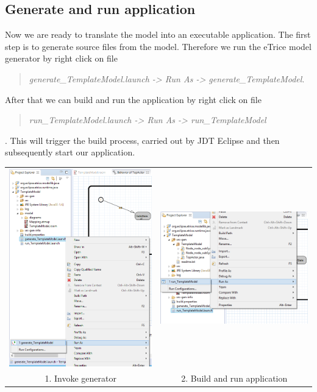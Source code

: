 \subsection{Generate and run application}

Now we are ready to translate the model into an executable application. The first step is to generate source files from the model. Therefore we run the eTrice model generator by right click on file \begin{quote}
	\emph{generate\_TemplateModel.launch -> Run As -> generate\_TemplateModel}.
\end{quote}
After that we can build and run the application by right click on file
\begin{quote}
	\emph{run\_TemplateModel.launch -> Run As -> run\_TemplateModel}
\end{quote}.
This will trigger the build process, carried out by JDT Eclipse and then subsequently start our application.

\begin{tabular}{cc}
	\includegraphics[width=.45\textwidth]{images/014-generate.png} & 
	\includegraphics[width=.45\textwidth]{images/014-build_run.png} \\
	1. Invoke generator & 2. Build and run application
\end{tabular}

